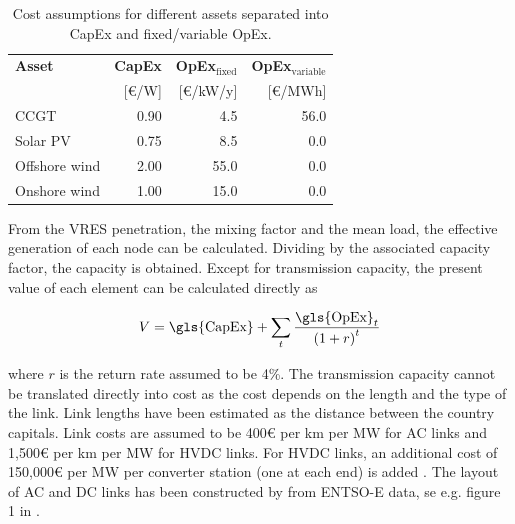 \documentclass[a4paper, 5p, sort&compress]{elsarticle}%
\newcommand{\paren}[1]{\left(#1\right)}
\begin{document}
\begin{table}[h!]
  \centering
  \caption{Cost assumptions for different assets separated into
    \gls{CapEx} and fixed/variable \gls{OpEx}.}
  \label{tab:cost-assumptions}
  \begin{tabular}{lrrr}  \toprule
    \textbf{Asset} & \textbf{\gls{CapEx} }& \textbf{\gls{OpEx}$_{\text{fixed}}$} & \textbf{\gls{OpEx}$_{\text{variable}}$}\\
    & [\euro/W] & [\euro/kW/y] & [\euro/MWh]\\ \midrule
    CCGT & 0.90 & 4.5 & 56.0\\
    Solar PV & 0.75 & 8.5 & 0.0\\
    Offshore wind & 2.00 & 55.0 & 0.0\\
    Onshore wind & 1.00 & 15.0 & 0.0\\
    \bottomrule
  \end{tabular}
\end{table}

From the VRES penetration, the mixing factor and the mean load, the
effective generation of each node can be calculated. Dividing by the
associated capacity factor, the capacity is obtained. Except for
transmission capacity, the present value of each element can be
calculated directly as

\begin{equation}
  \label{eq:6}
  V = \text{\gls{CapEx}} + \sum_{t} \frac{\text{\gls{OpEx}}_{t}}{\paren{1 + r}^{t}}
\end{equation}

where $r$ is the return rate assumed to be 4\%. The transmission
capacity cannot be translated directly into cost as the cost depends
on the length and the type of the link. Link lengths have been
estimated as the distance between the country capitals. Link costs are
assumed to be 400\euro{}
per km per MW for AC links and 1,500\euro{}
per km per MW for HVDC links. For HVDC links, an additional cost of
150,000\euro{} per MW
per converter station (one at each end) is added
\cite{McKinsey, Schaber, Schaber2}. The layout of AC and DC links has
been constructed by \cite{rolando2014} from ENTSO-E data, se
e.g. figure 1 in \cite{Sensitivity}.

\end{document}
